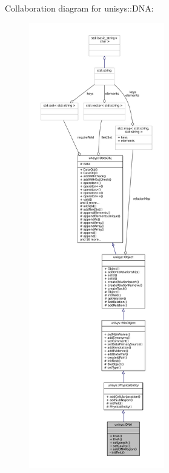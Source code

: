 Collaboration diagram for unisys\-:\-:D\-N\-A\-:
\nopagebreak
\begin{figure}[H]
\begin{center}
\leavevmode
\includegraphics[height=550pt]{classunisys_1_1DNA__coll__graph}
\end{center}
\end{figure}
